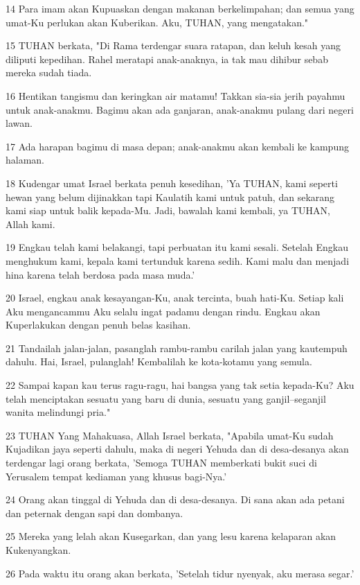 \par 14 Para imam akan Kupuaskan dengan makanan berkelimpahan; dan semua yang umat-Ku perlukan akan Kuberikan. Aku, TUHAN, yang mengatakan."
\par 15 TUHAN berkata, "Di Rama terdengar suara ratapan, dan keluh kesah yang diliputi kepedihan. Rahel meratapi anak-anaknya, ia tak mau dihibur sebab mereka sudah tiada.
\par 16 Hentikan tangismu dan keringkan air matamu! Takkan sia-sia jerih payahmu untuk anak-anakmu. Bagimu akan ada ganjaran, anak-anakmu pulang dari negeri lawan.
\par 17 Ada harapan bagimu di masa depan; anak-anakmu akan kembali ke kampung halaman.
\par 18 Kudengar umat Israel berkata penuh kesedihan, 'Ya TUHAN, kami seperti hewan yang belum dijinakkan tapi Kaulatih kami untuk patuh, dan sekarang kami siap untuk balik kepada-Mu. Jadi, bawalah kami kembali, ya TUHAN, Allah kami.
\par 19 Engkau telah kami belakangi, tapi perbuatan itu kami sesali. Setelah Engkau menghukum kami, kepala kami tertunduk karena sedih. Kami malu dan menjadi hina karena telah berdosa pada masa muda.'
\par 20 Israel, engkau anak kesayangan-Ku, anak tercinta, buah hati-Ku. Setiap kali Aku mengancammu Aku selalu ingat padamu dengan rindu. Engkau akan Kuperlakukan dengan penuh belas kasihan.
\par 21 Tandailah jalan-jalan, pasanglah rambu-rambu carilah jalan yang kautempuh dahulu. Hai, Israel, pulanglah! Kembalilah ke kota-kotamu yang semula.
\par 22 Sampai kapan kau terus ragu-ragu, hai bangsa yang tak setia kepada-Ku? Aku telah menciptakan sesuatu yang baru di dunia, sesuatu yang ganjil--seganjil wanita melindungi pria."
\par 23 TUHAN Yang Mahakuasa, Allah Israel berkata, "Apabila umat-Ku sudah Kujadikan jaya seperti dahulu, maka di negeri Yehuda dan di desa-desanya akan terdengar lagi orang berkata, 'Semoga TUHAN memberkati bukit suci di Yerusalem tempat kediaman yang khusus bagi-Nya.'
\par 24 Orang akan tinggal di Yehuda dan di desa-desanya. Di sana akan ada petani dan peternak dengan sapi dan dombanya.
\par 25 Mereka yang lelah akan Kusegarkan, dan yang lesu karena kelaparan akan Kukenyangkan.
\par 26 Pada waktu itu orang akan berkata, 'Setelah tidur nyenyak, aku merasa segar.'

